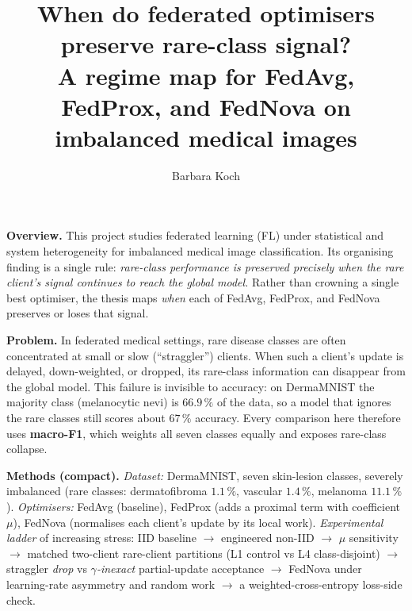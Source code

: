 \documentclass[11pt,a4paper]{article}
\title{\vspace{-1.4cm}When do federated optimisers preserve rare-class signal?\\
\large A regime map for FedAvg, FedProx, and FedNova on imbalanced medical images}
\author{Barbara Koch}
\date{}
\begin{document}
\maketitle
\vspace{-1.2cm}

\textbf{Overview.} This project studies federated learning (FL) under statistical
and system heterogeneity for imbalanced medical image classification. Its
organising finding is a single rule: \emph{rare-class performance is preserved
precisely when the rare client's signal continues to reach the global model.}
Rather than crowning a single best optimiser, the thesis maps \emph{when} each of
FedAvg, FedProx, and FedNova preserves or loses that signal.

\textbf{Problem.} In federated medical settings, rare disease classes are often
concentrated at small or slow (``straggler'') clients. When such a client's update
is delayed, down-weighted, or dropped, its rare-class information can disappear
from the global model. This failure is invisible to accuracy: on DermaMNIST the
majority class (melanocytic nevi) is $66.9\,\%$ of the data, so a model that
ignores the rare classes still scores about $67\,\%$ accuracy. Every comparison
here therefore uses \textbf{macro-F1}, which weights all seven classes equally and
exposes rare-class collapse.

\textbf{Methods (compact).} \emph{Dataset:} DermaMNIST, seven skin-lesion classes,
severely imbalanced (rare classes: dermatofibroma $1.1\,\%$, vascular $1.4\,\%$,
melanoma $11.1\,\%$). \emph{Optimisers:} FedAvg (baseline), FedProx (adds a
proximal term with coefficient $\mu$), FedNova (normalises each client's update by
its local work). \emph{Experimental ladder} of increasing stress: IID baseline
$\rightarrow$ engineered non-IID $\rightarrow$ $\mu$ sensitivity $\rightarrow$
matched two-client rare-client partitions (L1 control vs L4 class-disjoint)
$\rightarrow$ straggler \emph{drop} vs \emph{$\gamma$-inexact} partial-update
acceptance $\rightarrow$ FedNova under learning-rate asymmetry and random work
$\rightarrow$ a weighted-cross-entropy loss-side check.
\end{document}

